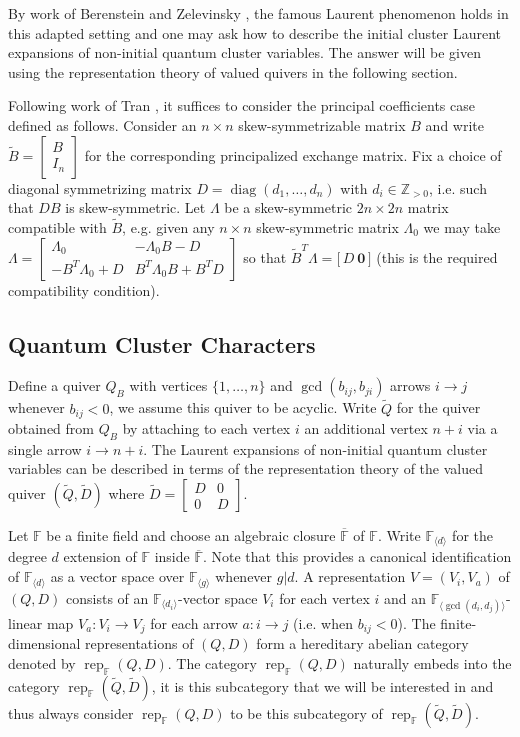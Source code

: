 \documentclass{amsart}
\newcommand{\FF}{\mathbb{F}}
\newcommand{\diag}{\operatorname{diag}}
\newcommand{\rep}{\operatorname{rep}}
\newcommand{\ZZ}{\mathbb{Z}}
\begin{document}
  By work of Berenstein and Zelevinsky \cite{berenstein-zelevinsky}, the famous Laurent phenomenon holds in this adapted setting and one may ask how to describe the initial cluster Laurent expansions of non-initial quantum cluster variables.  
  The answer will be given using the representation theory of valued quivers in the following section.

  Following work of Tran \cite{tran}, it suffices to consider the principal coefficients case defined as follows.  
  Consider an $n\times n$ skew-symmetrizable matrix $B$ and write $\tilde B=\left[\begin{array}{c}B\\ I_n\end{array}\right]$ for the corresponding principalized exchange matrix.  
  Fix a choice of diagonal symmetrizing matrix $D=\diag(d_1,\ldots,d_n)$ with $d_i\in\ZZ_{>0}$, i.e. such that $DB$ is skew-symmetric.
  Let $\Lambda$ be a skew-symmetric $2n\times2n$ matrix compatible with $\tilde B$, e.g. given any $n\times n$ skew-symmetric matrix $\Lambda_0$ we may take $\Lambda=\left[\begin{array}{cc}\Lambda_0 & -\Lambda_0B-D\\ -B^T\Lambda_0+D & B^T\Lambda_0B+B^TD\end{array}\right]$ so that $\tilde B^T\Lambda=\big[\,D\ \boldsymbol{0}\,\big]$ (this is the required compatibility condition).

  \subsection{Quantum Cluster Characters}
  Define a quiver $Q_B$ with vertices $\{1,\ldots,n\}$ and $\gcd(b_{ij},b_{ji})$ arrows $i\longrightarrow j$ whenever $b_{ij}<0$, we assume this quiver to be acyclic.
  Write $\tilde Q$ for the quiver obtained from $Q_B$ by attaching to each vertex $i$ an additional vertex $n+i$ via a single arrow $i\to n+i$.  
  The Laurent expansions of non-initial quantum cluster variables can be described in terms of the representation theory of the valued quiver $(\tilde Q,\tilde D)$ where $\tilde D=\left[\begin{array}{cc}D&0\\0&D\end{array}\right]$.

  Let $\FF$ be a finite field and choose an algebraic closure $\overline{\FF}$ of $\FF$.  
  Write $\FF_{\langle d\rangle}$ for the degree $d$ extension of $\FF$ inside $\overline{\FF}$.
  Note that this provides a canonical identification of $\FF_{\langle d\rangle}$ as a vector space over $\FF_{\langle g\rangle}$ whenever $g|d$.  
  A representation $V=(V_i,V_a)$ of $(Q,D)$ consists of an $\FF_{\langle d_i\rangle}$-vector space $V_i$ for each vertex $i$ and an $\FF_{\langle\gcd(d_i,d_j)\rangle}$-linear map $V_a:V_i\to V_j$ for each arrow $a:i\to j$ (i.e. when $b_{ij}<0$).  
  The finite-dimensional representations of $(Q,D)$ form a hereditary abelian category denoted by $\rep_\FF(Q,D)$.  
  The category $\rep_\FF(Q,D)$ naturally embeds into the category $\rep_\FF(\tilde Q,\tilde D)$, it is this subcategory that we will be interested in and thus always consider $\rep_\FF(Q,D)$ to be this subcategory of $\rep_\FF(\tilde Q,\tilde D)$.  
\end{document}
